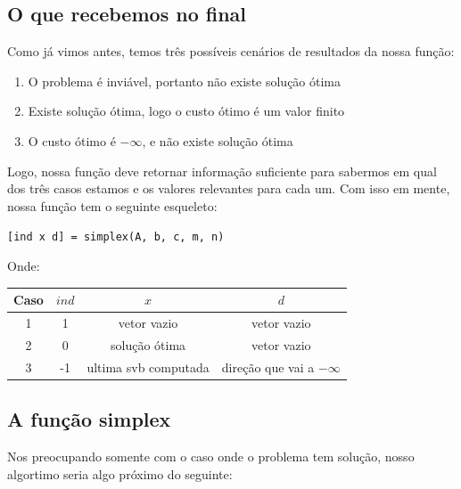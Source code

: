 \documentclass[12pt]{article}
\begin{document}
\subsection{O que recebemos no final}
    Como já vimos antes, temos três possíveis cenários de resultados da nossa função:
    \begin{enumerate}
        \item O problema é inviável, portanto não existe solução ótima
        \item Existe solução ótima, logo o custo ótimo é um valor finito
        \item O custo ótimo é $-\infty$, e não existe solução ótima
    \end{enumerate}
    Logo, nossa função deve retornar informação suficiente para sabermos em qual dos três casos estamos e os valores relevantes para cada um. Com isso em mente, nossa função tem o seguinte esqueleto:
    \begin{center}
        \texttt{[ind x d] = simplex(A, b, c, m, n)}
    \end{center}
    Onde:
    \begin{center}
    \begin{tabular}{ c  c  c  c }
        \textbf{Caso} & $ind$ & $x$  & $d$ \\  \hline
        1    & 1   & vetor vazio & vetor vazio \\
        2    & 0   & solução ótima & vetor vazio \\
        3    & -1  & ultima svb computada & direção que vai a $-\infty$ \\
    \end{tabular}
    \end{center}

\subsection{A função simplex}
    Nos preocupando somente com o caso onde o problema tem solução, nosso algortimo seria algo próximo do seguinte: 
\end{document}
